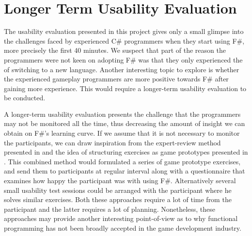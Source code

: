 \section{Longer Term Usability Evaluation}
The usability evaluation presented in this project gives only a small glimpse into the challenges faced by experienced C\# programmers when they start using F\#, more precisely the first 40 minutes. We suspect that part of the reason the programmers were not keen on adopting F\# was that they only experienced the  of switching to a new language. Another interesting topic to explore is whether the experienced gameplay programmers are more positive towards F\# after gaining more experience. This would require a longer-term usability evaluation to be conducted.

A longer-term usability evaluation presents the challenge that the programmers may not be monitored all the time, thus decreasing the amount of insight we can obtain on F\#'s learning curve. If we assume that it is not necessary to monitor the participants, we can draw inspiration from the expert-review method presented in \cite{nanz2013examining} and the idea of structuring exercises as game prototypes presented in . This combined method would formulated a series of game prototype exercises, and send them to participants at regular interval along with a questionnaire that examines how happy the participant was with using F\#. Alternatively several small usability test sessions could be arranged with the participant where he solves similar exercises. Both these approaches require a lot of time from the participant and the latter requires a lot of planning. Nonetheless, these approaches may provide another interesting point-of-view as to why functional programming has not been broadly accepted in the game development industry.   
